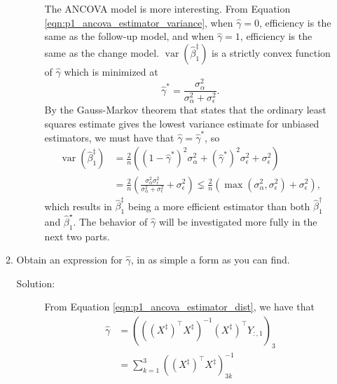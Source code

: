 \documentclass[letterpaper,11pt]{article}
\begin{document}
\begin{enumerate}
\begin{enumerate}
\begin{description}
      The ANCOVA model is more interesting. From Equation
      \ref{eqn:p1_ancova_estimator_variance}, when $\hat{\gamma} = 0$,
      efficiency is the same as the follow-up model, and when
      $\hat{\gamma} = 1$, efficiency is the same as the change model.
      $\operatorname{var}\left(\hat{\beta}_1^\ddagger\right)$ is a strictly
      convex function of $\hat{\gamma}$ which is minimized at
      \begin{equation}
        \hat{\gamma}^* = \frac{\sigma_\alpha^2}{\sigma_\alpha^2 + \sigma_\epsilon^2}.
        \label{eqn:p1_gamma_hat_optimal}
      \end{equation}
      By the Gauss-Markov theorem that states that the ordinary least squares
      estimate gives the lowest variance estimate for unbiased estimators, we
      must have that $\hat{\gamma} = \hat{\gamma}^*$, so
      \begin{align}
        \operatorname{var}\left(\hat{\beta}_1^\ddagger\right)
        &=
        \frac{2}{n}\left(
          \left(1 - \hat{\gamma}^*\right)^2\sigma_\alpha^2 +
          \left(\hat{\gamma}^*\right)^2\sigma_\epsilon^2 + \sigma_\epsilon^2
          \right) \nonumber \\
        &= \frac{2}{n}\left(
          \frac{\sigma_\alpha^2\sigma_\epsilon^2}{\sigma_\alpha^2 + \sigma_\epsilon^2}
          +
          \sigma_\epsilon^2
          \right) 
        \lneq \frac{2}{n}\left(
          \max\left(\sigma_\alpha^2, \sigma_\epsilon^2\right) + \sigma_\epsilon^2
          \right),
          \label{eqn:p1_ancova_estimator_variance_final}
      \end{align}            
      which results in $\hat{\beta}_1^\ddagger$ being a more efficient estimator
      than both $\hat{\beta}_1^\dagger$ and $\hat{\beta}_1^\star$. The behavior
      of $\hat{\gamma}$ will be investigated more fully in the next two parts.
    \end{description}
  \item Obtain an expression for $\hat{\gamma}$, in as simple a form as you can
    find.
    \begin{description}
    \item[Solution:] From Equation \ref{eqn:p1_ancova_estimator_dist}, we have that
      \begin{align}
        \hat{\gamma}
        &= \left(\left(\left(X^\ddagger\right)^\intercal X^\ddagger\right)^{-1}\left(X^\ddagger\right)^\intercal Y_{:,1}\right)_3 \label{eqn:p1_gamma_hat}\\
        &= \sum_{k=1}^3 \left(\left(X^\ddagger\right)^\intercal X^\ddagger\right)^{-1}_{3k}

\end{align}
\end{description}
\end{enumerate}
\end{enumerate}
\end{document}
